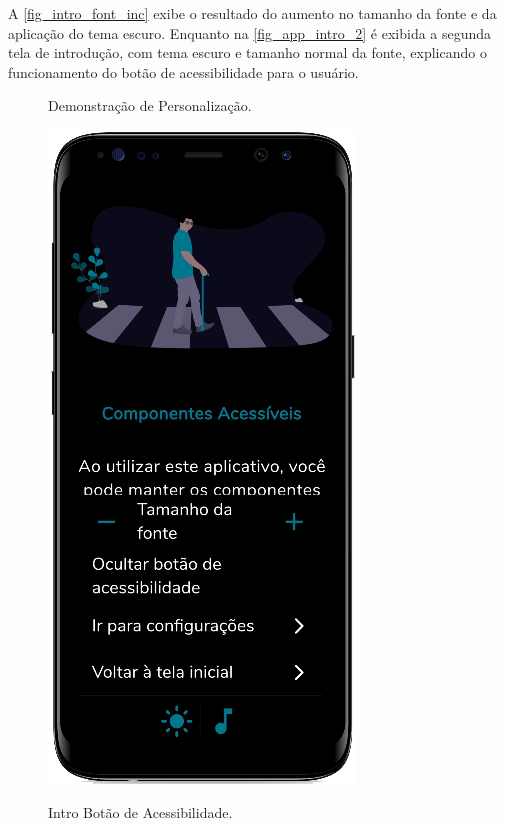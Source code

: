 A \autoref{fig_intro_font_inc} exibe o resultado do aumento no tamanho da fonte e da aplicação do tema escuro. Enquanto
na \autoref{fig_app_intro_2} é exibida a segunda tela de introdução, com tema escuro e tamanho normal da fonte,
explicando o funcionamento do botão de acessibilidade para o usuário.

\begin{figure}[htb]
    \centering
    \begin{minipage}{0.47\textwidth}
        \centering
        \caption{Demonstração de Personalização.}\label{fig_intro_font_inc}
        \includegraphics[scale=0.63]{Imagens/desenvolvimento/app/app_intro_font_inc.png}
    \end{minipage}
    \hfill
    \begin{minipage}{0.44\textwidth}
        \centering
        \caption{Intro Botão de Acessibilidade.}\label{fig_app_intro_2}

\end{minipage}
\end{figure}

